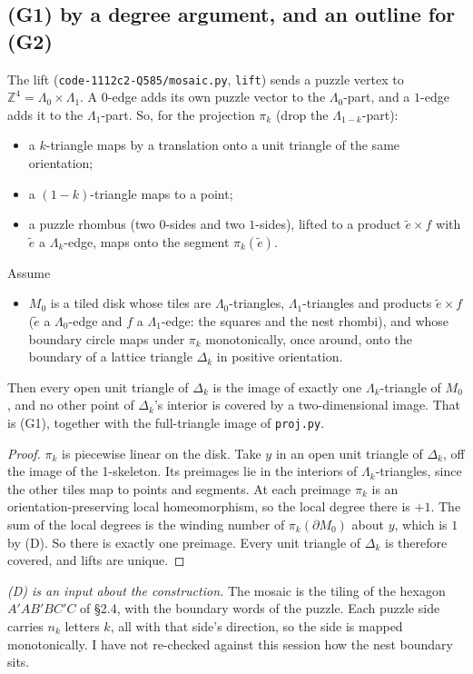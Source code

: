 \documentclass[11pt]{article}
\theoremstyle{definition}\newtheorem{definition}[theorem]{Definition}\newtheorem{remark}[theorem]{Remark}
\begin{document}
\subsection*{(G1) by a degree argument, and an outline for (G2)}
The lift (\texttt{code-1112c2-Q585/mosaic.py}, \texttt{lift}) sends a puzzle vertex to $\mathbb Z^4=\Lambda_0\times\Lambda_1$. A $0$-edge adds its own puzzle vector to the $\Lambda_0$-part, and a $1$-edge adds it to the $\Lambda_1$-part. So, for the projection $\pi_k$ (drop the $\Lambda_{1-k}$-part):
\begin{itemize}
\item a $k$-triangle maps by a translation onto a unit triangle of the same orientation;
\item a $(1-k)$-triangle maps to a point;
\item a puzzle rhombus (two $0$-sides and two $1$-sides), lifted to a product $\tilde e\times f$ with $\tilde e$ a $\Lambda_k$-edge, maps onto the segment $\pi_k(\tilde e)$.
\end{itemize}
\begin{proposition}\label{prop:G1}
Assume
\begin{itemize}
\item[(D)] $M_0$ is a tiled disk whose tiles are $\Lambda_0$-triangles, $\Lambda_1$-triangles and products $\tilde e\times f$ ($\tilde e$ a $\Lambda_0$-edge and $f$ a $\Lambda_1$-edge: the squares and the nest rhombi), and whose boundary circle maps under $\pi_k$ monotonically, once around, onto the boundary of a lattice triangle $\Delta_k$ in positive orientation.
\end{itemize}
Then every open unit triangle of $\Delta_k$ is the image of exactly one $\Lambda_k$-triangle of $M_0$, and no other point of $\Delta_k$'s interior is covered by a two-dimensional image. That is (G1), together with the full-triangle image of \texttt{proj.py}.
\end{proposition}
\begin{proof}
$\pi_k$ is piecewise linear on the disk. Take $y$ in an open unit triangle of $\Delta_k$, off the image of the 1-skeleton. Its preimages lie in the interiors of $\Lambda_k$-triangles, since the other tiles map to points and segments. At each preimage $\pi_k$ is an orientation-preserving local homeomorphism, so the local degree there is $+1$. The sum of the local degrees is the winding number of $\pi_k(\partial M_0)$ about $y$, which is $1$ by (D). So there is exactly one preimage. Every unit triangle of $\Delta_k$ is therefore covered, and lifts are unique.
\end{proof}
\noindent\emph{(D) is an input about the construction.} The mosaic is the tiling of the hexagon $A'AB'BC'C$ of \cite{P} \S2.4, with the boundary words of the puzzle. Each puzzle side carries $n_k$ letters $k$, all with that side's direction, so the side is mapped monotonically. I have not re-checked against \cite{P} this session how the nest boundary sits.
\end{document}

